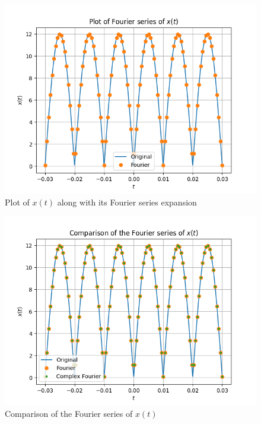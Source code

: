\documentclass[journal,12pt,twocolumn]{IEEEtran}
\numberwithin{equation}{section}
\numberwithin{figure}{section}
\renewcommand\thesection{\arabic{section}}
\begin{document}
\begin{enumerate}[label=\thesection.\arabic*,ref=\thesection.\theenumi]
	\begin{figure}[!ht]
		\centering
		\includegraphics[width=\columnwidth]{./figs/2.6.png}
		\caption{Plot of $x(t)$ along with its Fourier series expansion}
		\label{fig-2.6}	
	\end{figure}
	
	\begin{figure}[!ht]
		\centering
		\includegraphics[width=\columnwidth]{./figs/comparison.png}
		\caption{Comparison of the Fourier series of $x(t)$}
		\label{fig-comparison}	
	\end{figure}
	\end{enumerate}
\end{document}
